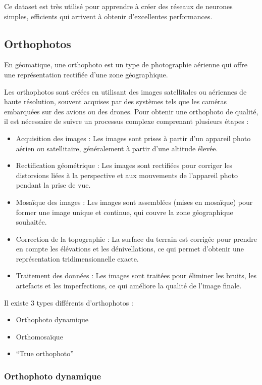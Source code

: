 Ce dataset est très utilisé pour apprendre à créer des réseaux de neurones simples, efficients qui arrivent à obtenir d'excellentes performances.

\newpage
\subsection{Orthophotos}

En géomatique, une orthophoto est un type de photographie aérienne qui offre une représentation rectifiée d'une zone géographique.

Les orthophotos sont créées en utilisant des images satellitales ou aériennes de haute résolution, souvent acquises par des systèmes tels que les caméras embarquées sur des avions ou des drones. Pour obtenir une orthophoto de qualité, il est nécessaire de suivre un processus complexe comprenant plusieurs étapes :
\begin{itemize}
    \item Acquisition des images : Les images sont prises à partir d'un appareil photo aérien ou satellitaire, généralement à partir d'une altitude élevée.
    \item Rectification géométrique : Les images sont rectifiées pour corriger les distorsions liées à la perspective et aux mouvements de l'appareil photo pendant la prise de vue.
    \item Mosaïque des images : Les images sont assemblées (mises en mosaïque) pour former une image unique et continue, qui couvre la zone géographique souhaitée.
    \item Correction de la topographie : La surface du terrain est corrigée pour prendre en compte les élévations et les dénivellations, ce qui permet d'obtenir une représentation tridimensionnelle exacte.
    \item Traitement des données : Les images sont traitées pour éliminer les bruits, les artefacts et les imperfections, ce qui améliore la qualité de l'image finale.
\end{itemize}

Il existe 3 types différents d'orthophotos \cite{barrette_different_2022} :
\begin{itemize}
    \item Orthophoto dynamique
    \item Orthomosaïque
    \item ``True orthophoto''
\end{itemize}

\subsubsection{Orthophoto dynamique}


